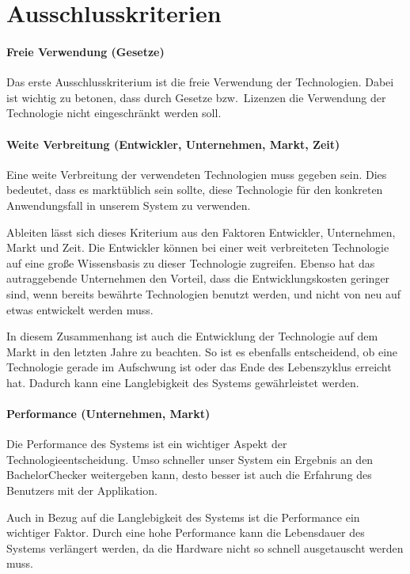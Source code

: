 \section{Ausschlusskriterien}\label{sec:ausschlusskriterien}

\paragraph{Freie Verwendung (Gesetze)}\label{par:freie-verwendung}
Das erste Ausschlusskriterium ist die freie Verwendung der Technologien.
Dabei ist wichtig zu betonen, dass durch Gesetze bzw.\ Lizenzen die
Verwendung der Technologie nicht eingeschränkt werden soll.

\paragraph{Weite Verbreitung (Entwickler, Unternehmen, Markt, Zeit)}\label{par:weite-verbreitung}
Eine weite Verbreitung der verwendeten Technologien muss gegeben sein.
Dies bedeutet, dass es marktüblich sein sollte, diese Technologie für den
konkreten Anwendungsfall in unserem System zu verwenden.

Ableiten lässt sich dieses Kriterium aus den Faktoren Entwickler, Unternehmen, Markt und Zeit.
Die Entwickler können bei einer weit verbreiteten Technologie
auf eine große Wissensbasis zu dieser Technologie zugreifen.
Ebenso hat das autraggebende Unternehmen den Vorteil, dass die Entwicklungskosten geringer sind,
wenn bereits bewährte Technologien benutzt werden, und nicht von neu auf etwas entwickelt werden muss.

In diesem Zusammenhang ist auch die Entwicklung der Technologie auf dem
Markt in den letzten Jahre zu beachten.
So ist es ebenfalls entscheidend, ob eine Technologie gerade im Aufschwung
ist oder das Ende des Lebenszyklus erreicht hat.
Dadurch kann eine Langlebigkeit des Systems gewährleistet werden.

\paragraph{Performance (Unternehmen, Markt)}\label{par:performance}
Die Performance des Systems ist ein wichtiger Aspekt der Technologieentscheidung.
Umso schneller unser System ein Ergebnis an den BachelorChecker weitergeben kann,
desto besser ist auch die Erfahrung des Benutzers mit der Applikation.

Auch in Bezug auf die Langlebigkeit des Systems ist die Performance ein wichtiger Faktor.
Durch eine hohe Performance kann die Lebensdauer des Systems verlängert werden,
da die Hardware nicht so schnell ausgetauscht werden muss.

